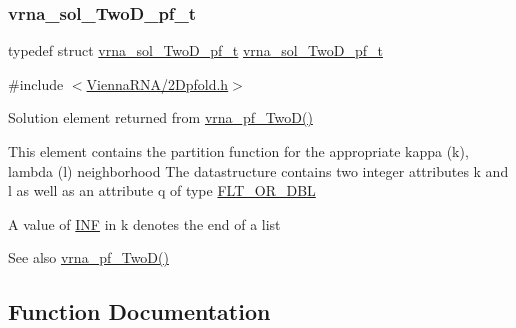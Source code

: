 \subsubsection{\texorpdfstring{vrna\_sol\_TwoD\_pf\_t}{vrna\_sol\_TwoD\_pf\_t}}
{\footnotesize\ttfamily typedef struct \mbox{\hyperlink{group__kl__neighborhood__pf_structvrna__sol__TwoD__pf__t}{vrna\+\_\+sol\+\_\+\+Two\+D\+\_\+pf\+\_\+t}}  \mbox{\hyperlink{group__kl__neighborhood__pf_structvrna__sol__TwoD__pf__t}{vrna\+\_\+sol\+\_\+\+Two\+D\+\_\+pf\+\_\+t}}}



{\ttfamily \#include $<$\mbox{\hyperlink{2Dpfold_8h}{Vienna\+R\+N\+A/2\+Dpfold.\+h}}$>$}



Solution element returned from \mbox{\hyperlink{group__kl__neighborhood__pf_ga0bc3427689bd09da09b8b3094a27f836}{vrna\+\_\+pf\+\_\+\+Two\+D()}} 

This element contains the partition function for the appropriate kappa (k), lambda (l) neighborhood The datastructure contains two integer attributes \textquotesingle{}k\textquotesingle{} and \textquotesingle{}l\textquotesingle{} as well as an attribute \textquotesingle{}q\textquotesingle{} of type \mbox{\hyperlink{group__data__structures_ga31125aeace516926bf7f251f759b6126}{F\+L\+T\+\_\+\+O\+R\+\_\+\+D\+BL}}

A value of \mbox{\hyperlink{constants_8h_a12c2040f25d8e3a7b9e1c2024c618cb6}{I\+NF}} in k denotes the end of a list

\begin{DoxySeeAlso}{See also}
\mbox{\hyperlink{group__kl__neighborhood__pf_ga0bc3427689bd09da09b8b3094a27f836}{vrna\+\_\+pf\+\_\+\+Two\+D()}} 
\end{DoxySeeAlso}


\subsection{Function Documentation}
\mbox{\label{group__kl__neighborhood__pf_ga0bc3427689bd09da09b8b3094a27f836}} 
